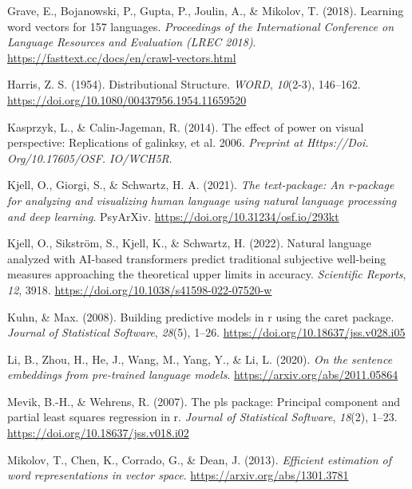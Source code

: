 \documentclass[
  man,
  floatsintext,
  longtable,
  nolmodern,
  notxfonts,
  notimes,
  colorlinks=true,linkcolor=blue,citecolor=blue,urlcolor=blue]{apa7}
\newlength{\cslhangindent}
\newenvironment{CSLReferences}[2] %
 {\begin{list}{}{%
  \setlength{\itemindent}{0pt}
  \setlength{\leftmargin}{0pt}
  \setlength{\parsep}{0pt}
  \ifodd #1
   \setlength{\leftmargin}{\cslhangindent}
   \setlength{\itemindent}{-1\cslhangindent}
  \fi
  \setlength{\itemsep}{#2\baselineskip}}}
 {\end{list}}
\begin{document}
\begin{CSLReferences}{1}{0}
Grave, E., Bojanowski, P., Gupta, P., Joulin, A., \& Mikolov, T. (2018).
Learning word vectors for 157 languages. \emph{Proceedings of the
International Conference on Language Resources and Evaluation (LREC
2018)}. \url{https://fasttext.cc/docs/en/crawl-vectors.html}

Harris, Z. S. (1954). Distributional {Structure}. \emph{WORD},
\emph{10}(2-3), 146--162.
\url{https://doi.org/10.1080/00437956.1954.11659520}

Kasprzyk, L., \& Calin-Jageman, R. (2014). The effect of power on visual
perspective: Replications of galinksy, et al. 2006. \emph{Preprint at
Https://Doi. Org/10.17605/OSF. IO/WCH5R}.

Kjell, O., Giorgi, S., \& Schwartz, H. A. (2021). \emph{The
text-package: An r-package for analyzing and visualizing human language
using natural language processing and deep learning}. PsyArXiv.
\url{https://doi.org/10.31234/osf.io/293kt}

Kjell, O., Sikström, S., Kjell, K., \& Schwartz, H. (2022). Natural
language analyzed with AI-based transformers predict traditional
subjective well-being measures approaching the theoretical upper limits
in accuracy. \emph{Scientific Reports}, \emph{12}, 3918.
\url{https://doi.org/10.1038/s41598-022-07520-w}

Kuhn, \& Max. (2008). Building predictive models in r using the caret
package. \emph{Journal of Statistical Software}, \emph{28}(5), 1--26.
\url{https://doi.org/10.18637/jss.v028.i05}

Li, B., Zhou, H., He, J., Wang, M., Yang, Y., \& Li, L. (2020). \emph{On
the sentence embeddings from pre-trained language models}.
\url{https://arxiv.org/abs/2011.05864}

Mevik, B.-H., \& Wehrens, R. (2007). The pls package: Principal
component and partial least squares regression in r. \emph{Journal of
Statistical Software}, \emph{18}(2), 1--23.
\url{https://doi.org/10.18637/jss.v018.i02}

Mikolov, T., Chen, K., Corrado, G., \& Dean, J. (2013). \emph{Efficient
estimation of word representations in vector space}.
\url{https://arxiv.org/abs/1301.3781}


\end{CSLReferences}
\end{document}
